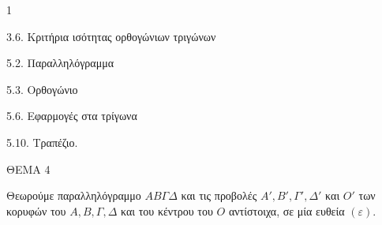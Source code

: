 \begin{ylh}{1}
    \item 3.6. Κριτήρια ισότητας ορθογώνιων τριγώνων
    \item 5.2. Παραλληλόγραμμα
    \item 5.3. Ορθογώνιο
    \item 5.6. Εφαρμογές στα τρίγωνα
    \item 5.10. Τραπέζιο.
\end{ylh}

ΘΕΜΑ 4

Θεωρούμε παραλληλόγραμμο $ΑΒ\Gamma\Delta$ και τις προβολές $Α', Β', \Gamma', \Delta'$ και $Ο'$ των κορυφών του $Α, Β, \Gamma, \Delta$ και του κέντρου του $Ο$ αντίστοιχα, σε μία ευθεία $(\varepsilon)$.

